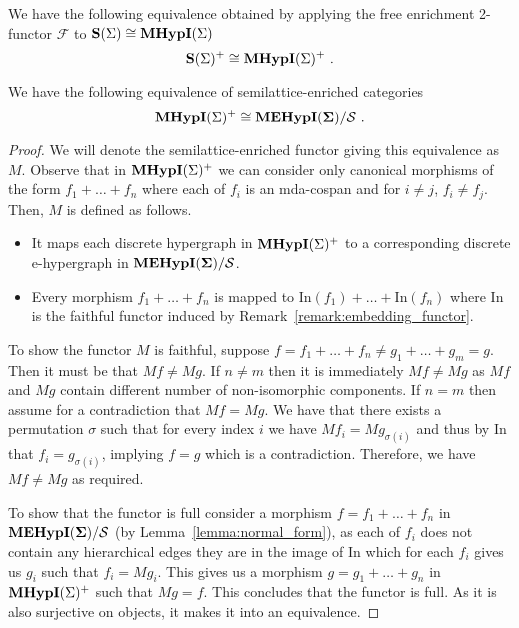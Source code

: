 \begin{lemma}
\label{lemma:2functor_equiv}
We have the following equivalence obtained by applying the free enrichment 2-functor $\mathcal{F}$ to $\mathbf{S}(\Sigma) \cong \textbf{MHypI}(\Sigma)$
\[
\mathbf{S}(\Sigma)^{+} \cong \textbf{MHypI}(\Sigma)^{+}~.
\]
\end{lemma}




\begin{lemma}
\label{lemma:cospans_plus_equiv}
We have the following equivalence of semilattice-enriched categories
\[
\textbf{MHypI}(\Sigma)^{+} \cong {\mathbf{MEHypI(\Sigma)}}/\mathcal{S}~.
\]
\end{lemma}
\begin{proof}
We will denote the semilattice-enriched functor giving this equivalence as $M$.
Observe that in $\textbf{MHypI}(\Sigma)^{+}$ we can consider only canonical morphisms of the form $f_{1} + \ldots + f_{n}$ where each of $f_{i}$ is an mda-cospan and for $i \not = j$, $f_{i} \not = f_{j}$.
Then, $M$ is defined as follows.
\begin{itemize}
\item It maps each discrete hypergraph in $\textbf{MHypI}(\Sigma)^{+}$ to a corresponding discrete e-hypergraph in ${\mathbf{MEHypI(\Sigma)}}/\mathcal{S}$.
\item Every morphism $f_{1} + \ldots + f_{n}$ is mapped to $\text{In}(f_{1}) + \ldots + \text{In}(f_{n})$ where $\text{In}$ is the faithful functor induced by Remark~\ref{remark:embedding_functor}.
\end{itemize}
To show the functor $M$ is faithful, suppose $f = f_{1} + \ldots + f_{n} \not = g_{1} + \ldots + g_{m} = g$.
Then it must be that $Mf \not = Mg$.
If $n \not = m$ then it is immediately $Mf \not = Mg$ as $Mf$ and $Mg$ contain different number of non-isomorphic components.
If $n = m$ then assume for a contradiction that $Mf = Mg$. 
We have that there exists a permutation $\sigma$ such that for every index $i$ we have $Mf_{i} = Mg_{\sigma(i)}$ and thus by $\text{In}$ that $f_{i} = g_{\sigma(i)}$, implying $f = g$ which is a contradiction.
Therefore, we have $Mf \not = Mg$ as required.

To show that the functor is full consider a morphism $f = f_{1} + \ldots + f_{n}$ in ${\mathbf{MEHypI(\Sigma)}} / \mathcal{S}$ (by Lemma~\ref{lemma:normal_form}), as each of $f_{i}$ does not contain any hierarchical edges they are in the image of $\text{In}$ which for each $f_{i}$ gives us $g_{i}$ such that $f_{i} = Mg_{i}$.
This gives us a morphism $g = g_{1} + \ldots + {g_{n}}$ in $\textbf{MHypI}(\Sigma)^{+}$ such that $Mg = f$.
This concludes that the functor is full.
As it is also surjective on objects, it makes it into an equivalence.
\end{proof}


